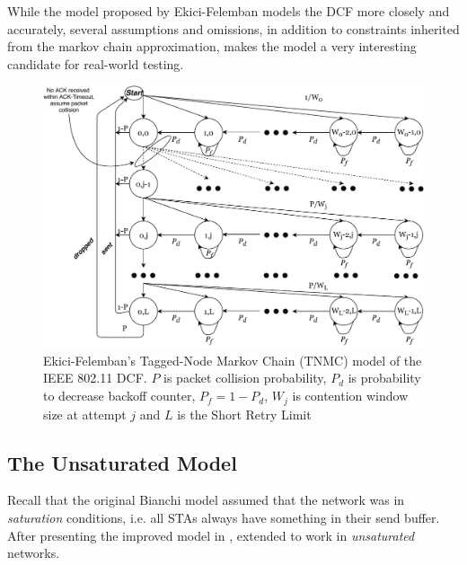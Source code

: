 While the model proposed by Ekici-Felemban models the DCF more closely and
accurately, several assumptions and omissions, in addition to constraints
inherited from the markov chain approximation, makes the model a very
interesting candidate for real-world testing. 

\begin{figure}
\center
\includegraphics[width=1\textwidth]{images/tnmc-dcf.pdf}
\caption{Ekici-Felemban's Tagged-Node Markov Chain (TNMC) model of the IEEE 802.11 DCF. $P$ is packet collision probability, $P_d$ is probability to decrease backoff counter, $P_f = 1 - P_d$, $W_j$ is contention window size at attempt $j$ and $L$ is the Short Retry Limit}
\label{fig:tnmc}
\end{figure}

\subsection{The Unsaturated Model}

Recall that the original Bianchi model assumed that the network was in
\emph{saturation} conditions, i.e. all STAs always have something in their
send buffer. After presenting the improved model in \cite{felemban}, 
extended to work in \emph{unsaturated} networks.